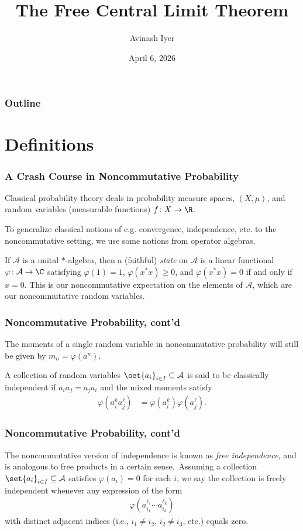 \documentclass{beamer}
\title{The Free Central Limit Theorem}
\author{Avinash Iyer}
\institute{University of Virginia}
\date{April 6, 2026}
\begin{document}
\begin{frame}
  \titlepage
\end{frame}

\begin{frame}
  \frametitle{Outline}
  \tableofcontents
\end{frame}
\section{Definitions}%
\begin{frame}
  \frametitle{A Crash Course in Noncommutative Probability}
  Classical probability theory deals in probability measure spaces, $\left( X,\mu \right)$, and random variables (measurable functions) $f\colon X\rightarrow \R$.\newline\pause

  To generalize classical notions of e.g. convergence, independence, etc. to the noncommutative setting, we use some notions from operator algebras.\newline\pause

  If $\mathcal{A}$ is a unital ${\ast}$-algebra, then a (faithful) \textit{state} on $\mathcal{A}$ is a linear functional $\varphi\colon \mathcal{A}\rightarrow \C$ satisfying $\varphi\left( 1 \right) = 1$, $\varphi\left( x^{\ast}x \right) \geq 0$, and $\varphi\left( x^{\ast}x \right) = 0$ if and only if $x = 0$. This is our noncommutative expectation on the elements of $\mathcal{A}$, which are our noncommutative random variables.
\end{frame}
\begin{frame}
  \frametitle{Noncommutative Probability, cont'd}
  The moments of a single random variable in noncommutative probability will still be given by $m_n = \varphi\left( a^n \right)$.\newline\pause

  A collection of random variables $\set{a_i}_{i\in I}\subseteq \mathcal{A}$ is said to be classically independent if $a_ia_j = a_ja_i$ and the mixed moments satisfy
  \begin{align*}
    \varphi\left( a_i^{k}a_j^{\ell} \right) &= \varphi\left( a_i^{k} \right)\varphi\left( a_j^{\ell} \right).
  \end{align*}
\end{frame}
\begin{frame}
  \frametitle{Noncommutative Probability, cont'd}
  The noncommutative version of independence is known as \textit{free independence}, and is analogous to free products in a certain sense.\pause\ Assuming a collection $ \set{a_i}_{i\in I} \subseteq \mathcal{A}$ satisfies $\varphi\left( a_i \right) = 0$ for each $i$, we say the collection is freely independent whenever any expression of the form
  \begin{align*}
    \varphi\left( a_{i_1}^{\ell_1}\cdots a_{i_k}^{\ell_k} \right)
  \end{align*}
  with distinct adjacent indices (i.e., $i_1\neq i_2$, $i_2\neq i_3$, etc.) equals zero.
\end{frame}
\end{document}
